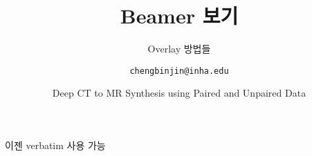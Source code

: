 \documentclass[xcolor=table]{beamer}
\title{Beamer 보기}
\subtitle{Overlay 방법들}
\author[김성빈]{\texttt{chengbinjin@inha.edu}}
\date[\today]{Deep CT to MR Synthesis using Paired and Unpaired Data}
\institute{INHA University}
\begin{document}
\begin{frame}
\titlepage
\end{frame}

\begin{frame}[fragile]
이젠 verbatim 사용 가능
\end{frame}

\begin{frame}[fragile]
\end{frame}
\end{document}
